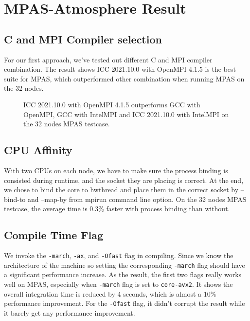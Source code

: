 \pgfplotsset{compat=1.17}

\section{MPAS-Atmosphere Result}
\label{sec:conc}

\subsection{C and MPI Compiler selection}
For our first approach, we've tested out different C and MPI compiler combination. The result shows ICC 2021.10.0 with OpenMPI 4.1.5 is the best suite for MPAS, which outperformed other combination when running MPAS on the 32 nodes. 

\begin{figure}[ht]
  \centering
  \caption{ICC 2021.10.0 with OpenMPI 4.1.5 outperforms GCC with OpenMPI, GCC with IntelMPI and ICC 2021.10.0 with IntelMPI on the 32 nodes MPAS testcase.}
  \label{fig:bar_chart}
\end{figure}

\subsection{CPU Affinity}
With two CPUs on each node, we have to make sure the process binding is consisted during runtime, and the socket they are placing is correct. At the end, we chose to bind the core to hwthread and place them in the correct socket by --bind-to and --map-by from mpirun command line option. On the 32 nodes MPAS testcase, the average time is 0.3\% faster with process binding than without.

\subsection{Compile Time Flag}
We invoke the \texttt{-march}, \texttt{-ax}, and \texttt{-Ofast} flag in compiling. Since we know the architecture of the machine so setting the corresponding \texttt{-march} flag should have a significant performance increase. As the result, the first two flags really works well on MPAS, especially when \texttt{-march} flag is set to \texttt{core-avx2}. It shows the overall integration time is reduced by 4 seconds, which is almost a 10\% performance improvement. For the \texttt{-Ofast} flag, it didn't corrupt the result while it barely get any performance improvement.


